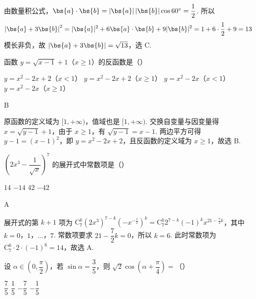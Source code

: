 \begin{solution}
由数量积公式，\(\bs{a}\cdot\bs{b}=|\bs{a}|\,|\bs{b}|\cos60^{\circ}=\dfrac12\). 所以
\[
\left|\bs{a}+3\bs{b}\right|^2=|\bs{a}|^2+6\bs{a}\cdot\bs{b}+9|\bs{b}|^2=1+6\cdot\frac12+9=13
\]
模长非负，故 \(\left|\bs{a}+3\bs{b}\right|=\sqrt{13}\)，选 C.
\end{solution}

\begin{problem}
函数 \(y=\sqrt{x-1}+1\)（\(x\geqslant1\)）的反函数是（\quad）

\choices
    {\(y=x^{2}-2x+2\)（\(x<1\)）}
    {\(y=x^{2}-2x+2\)（\(x\geqslant1\)）}
    {\(y=x^{2}-2x\)（\(x<1\)）}
    {\(y=x^{2}-2x\)（\(x\geqslant1\)）}
\end{problem}

\begin{answer}
B
\end{answer}

\begin{solution}
原函数的定义域为 \([1,+\infty)\)，值域也是 \([1,+\infty)\). 交换自变量与因变量得 \(x=\sqrt{y-1}+1\)，由于 \(x\geqslant1\)，有 \(\sqrt{y-1}=x-1\). 两边平方可得 \(y-1=(x-1)^2\)，即 \(y=x^2-2x+2\)，且反函数的定义域为 \(x\geqslant1\)，故选 B.
\end{solution}

\begin{problem}
\(\left(2x^3-\dfrac1{\sqrt{x}}\right)^7\) 的展开式中常数项是（\quad）

\choices
    {\(14\)}
    {\(-14\)}
    {\(42\)}
    {\(-42\)}
\end{problem}

\begin{answer}
A
\end{answer}

\begin{solution}
展开式的第 \(k+1\) 项为 \(\mathrm C_7^k(2x^3)^{7-k}\left(-x^{-\frac12}\right)^k=\mathrm C_7^k2^{7-k}(-1)^kx^{21-\frac72k}\)，其中 \(k=0\)，\(1\)，\(\ldots\)，\(7\). 常数项要求 \(21-\dfrac72k=0\)，所以 \(k=6\). 此时常数项为 \(\mathrm C_7^6\cdot2\cdot(-1)^6=14\)，故选 A.
\end{solution}

\begin{problem}
设 \(\alpha\in\left(0,\dfrac\pi2\right)\)，若 \(\sin\alpha=\dfrac35\)，则 \(\sqrt2\cos\left(\alpha+\dfrac\pi4\right)=\)（\quad）

\choices
    {\(\dfrac75\)}
    {\(\dfrac15\)}
    {\(-\dfrac75\)}
    {\(-\dfrac15\)}
\end{problem}

